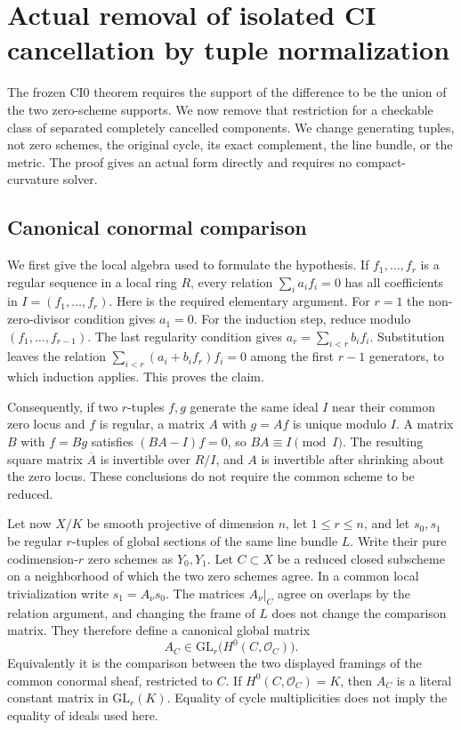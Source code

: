\section{Actual removal of isolated CI cancellation by tuple normalization}
\label{sec:r9-isolated-ci-cancellation}

The frozen CI0 theorem requires the support of the difference
to be the union of the two zero-scheme supports.  We now remove
that restriction for a checkable class of separated completely
cancelled components.  We change generating tuples, not zero
schemes, the original cycle, its exact complement, the line
bundle, or the metric.  The proof gives an actual form directly
and requires no compact-curvature solver.

\subsection{Canonical conormal comparison}

We first give the local algebra used to formulate the hypothesis.
If $f_1,\ldots,f_r$ is a regular sequence in a local ring $R$,
every relation $\sum_i a_i f_i=0$ has all coefficients in
$I=(f_1,\ldots,f_r)$.  Here is the required elementary argument.
For $r=1$ the non-zero-divisor condition gives $a_1=0$.
For the induction step, reduce modulo $(f_1,\ldots,f_{r-1})$.
The last regularity condition gives
$a_r=\sum_{i<r}b_i f_i$.  Substitution leaves the relation
$\sum_{i<r}(a_i+b_i f_r)f_i=0$ among the first $r-1$
generators, to which induction applies.  This proves the claim.

Consequently, if two $r$-tuples $f,g$ generate the same ideal
$I$ near their common zero locus and $f$ is regular, a matrix
$A$ with $g=Af$ is unique modulo $I$.  A matrix $B$ with
$f=Bg$ satisfies $(BA-I)f=0$, so $BA\equiv I\pmod I$.
The resulting square matrix $\overline A$ is invertible over
$R/I$, and $A$ is invertible after shrinking about the zero
locus.  These conclusions do not require the common scheme
to be reduced.

Let now $X/K$ be smooth projective of dimension $n$, let
$1\le r\le n$, and let $s_0,s_1$ be regular $r$-tuples of
global sections of the same line bundle $L$.  Write their pure
codimension-$r$ zero schemes as $Y_0,Y_1$.  Let $C\subset X$
be a reduced closed subscheme on a neighborhood of which the
two zero schemes agree.  In a common local trivialization
write $s_1=A_\nu s_0$.  The matrices $A_\nu|_C$ agree on
overlaps by the relation argument, and changing the frame of
$L$ does not change the comparison matrix.  They therefore
define a canonical global matrix
\[
         A_C\in\mathrm{GL}_r\bigl(H^0(C,\mathcal O_C)\bigr).
 \tag{ICC1}
\]
Equivalently it is the comparison between the two displayed
framings of the common conormal sheaf, restricted to $C$.
If $H^0(C,\mathcal O_C)=K$, then $A_C$ is a literal constant
matrix in $\mathrm{GL}_r(K)$.  Equality of cycle multiplicities
does not imply the equality of ideals used here.

